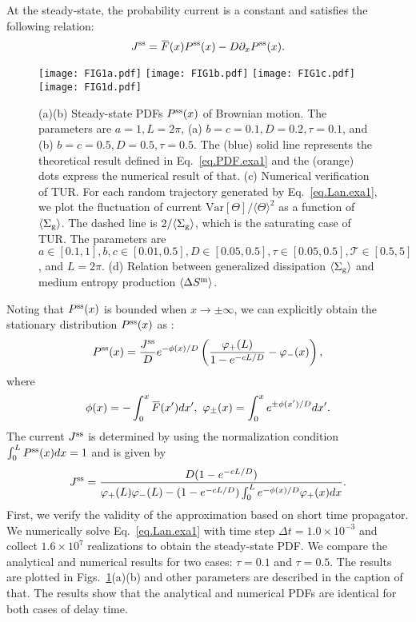 \documentclass[pre,
twocolumn,
]{revtex4-1}
\newcommand{\overbar}[1]{\mkern 1.5mu\overline{\mkern-1.5mu#1\mkern-1.5mu}\mkern 1.5mu}
\theoremstyle{definition}
\theoremstyle{definition}
\newcommand{\mca}{\mathcal}
\newcommand{\mrm}{\mathrm}
\newcommand{\eq}[1]{\begin{equation}#1\end{equation}}
\newcommand{\eqs}[1]{\begin{equation*}#1\end{equation*}}
\newcommand{\avg}[1]{\langle #1\rangle}
\newcommand{\inl}[1]{$ #1 $}
\newcommand{\bra}[1]{\left( #1 \right)}
\begin{document}
At the steady-state, the probability current is a constant and satisfies the following relation:
\eq{
J^{\rm ss}=\overbar{F}(x)P^{\rm ss}(x)-D\partial_xP^{\rm ss}(x).
}
\begin{figure}[t]
	\centering
	\texttt{[image: FIG1a.pdf]}
	\texttt{[image: FIG1b.pdf]}
	\texttt{[image: FIG1c.pdf]}
	\texttt{[image: FIG1d.pdf]}
	\caption{(a)(b) Steady-state PDFs \inl{P^{\rm ss}(x)} of Brownian motion. The parameters are \inl{a=1,L=2\pi}, (a) \inl{b=c=0.1,D=0.2,\tau=0.1}, and (b) \inl{b=c=0.5,D=0.5,\tau=0.5}. The (blue) solid line represents the theoretical result defined in Eq.~\eqref{eq.PDF.exa1} and the (orange) dots express the numerical result of that. (c) Numerical verification of TUR. For each random trajectory generated by Eq.~\eqref{eq.Lan.exa1}, we plot the fluctuation of current \inl{\mrm{Var}[\Theta]/\avg{\Theta}^2} as a function of \inl{\avg{\Sigma_{\rm g}}}. The dashed line is \inl{2/\avg{\Sigma_{\rm g}}}, which is the saturating case of TUR. The parameters are \inl{a\in[0.1,1],b,c\in[0.01,0.5],D\in[0.05,0.5],\tau\in[0.05,0.5],\mca{T}\in[0.5,5]}, and \inl{L=2\pi}. (d) Relation between generalized dissipation \inl{\avg{\Sigma_{\rm g}}} and medium entropy production \inl{\avg{\Delta S^{\rm m}}}.}\label{fig.exa1}
\end{figure}
Noting that \inl{P^{\rm ss}(x)} is bounded when \inl{x\to\pm\infty}, we can explicitly obtain the stationary distribution \inl{P^{\rm ss}(x)} as \cite{Hyeon.2017.PRE}:
\eq{
P^{\rm ss}(x)=\frac{J^{\rm ss}}{D}e^{-\phi(x)/D}\bra{\frac{\varphi_+(L)}{1-e^{-cL/D}}-\varphi_{-}(x)},\label{eq.PDF.exa1}
}
where 
\eqs{
\phi(x)=-\int_0^x\overbar{F}(x') dx',~\varphi_{\pm}(x)=\int_{0}^xe^{\pm \phi(x')/D}dx'.
}
The current \inl{J^{\rm ss}} is determined by using the normalization condition \inl{\int_0^LP^{\rm ss}(x)dx=1} and is given by
\eq{
J^{\rm ss}=\frac{D(1-e^{-cL/D})}{\varphi_{+}(L)\varphi_{-}(L)-(1-e^{-cL/D})\int_0^Le^{-\phi(x)/D}\varphi_{+}(x)dx}.
}
First, we verify the validity of the approximation based on short time propagator.
We numerically solve Eq.~\eqref{eq.Lan.exa1} with time step \inl{\Delta t=1.0\times 10^{-3}} and collect \inl{1.6\times 10^7} realizations to obtain the steady-state PDF.
We compare the analytical and numerical results for two cases: \inl{\tau=0.1} and \inl{\tau=0.5}.
The results are plotted in Figs.~\ref{fig.exa1}(a)(b) and other parameters are described in the caption of that.
The results show that the analytical and numerical PDFs are identical for both cases of delay time.
\end{document}
